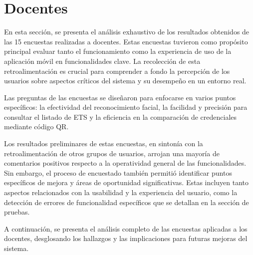 \section{Docentes}

En esta sección, se presenta el análisis exhaustivo de los resultados obtenidos de las 15 encuestas realizadas a docentes. Estas encuestas tuvieron como propósito principal evaluar tanto el funcionamiento como la experiencia de uso de la aplicación móvil en funcionalidades clave. La recolección de esta retroalimentación es crucial para comprender a fondo la percepción de los usuarios sobre aspectos críticos del sistema y su desempeño en un entorno real. 

Las preguntas de las encuestas se diseñaron para enfocarse en varios puntos específicos: la efectividad del reconocimiento facial, la facilidad y precisión para consultar el listado de ETS y la eficiencia en la comparación de credenciales mediante código QR. 

Los resultados preliminares de estas encuestas, en sintonía con la retroalimentación de otros grupos de usuarios, arrojan una mayoría de comentarios positivos respecto a la operatividad general de las funcionalidades. Sin embargo, el proceso de encuestado también permitió identificar puntos específicos de mejora y áreas de oportunidad significativas. Estas incluyen tanto aspectos relacionados con la usabilidad y la experiencia del usuario, como la detección de errores de funcionalidad específicos que se detallan en la sección de pruebas.

A continuación, se presenta el análisis completo de las encuestas aplicadas a los docentes, desglosando los hallazgos y las implicaciones para futuras mejoras del sistema. 
